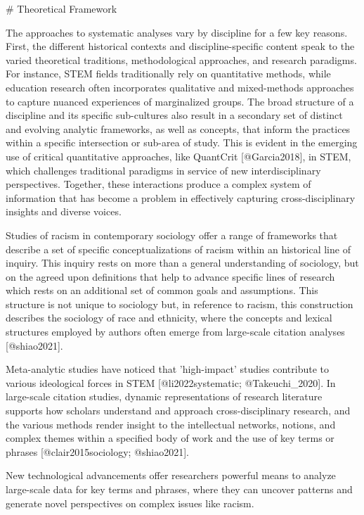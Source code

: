 # Theoretical Framework

The approaches to systematic analyses vary by discipline for a few key reasons. 
First, the different historical contexts and discipline-specific content speak to the varied theoretical traditions, methodological approaches, and research paradigms.
For instance, STEM fields traditionally rely on quantitative methods, while education research often incorporates qualitative and mixed-methods approaches to capture nuanced experiences of marginalized groups.
The broad structure of a discipline and its specific sub-cultures also result in a secondary set of distinct and evolving analytic frameworks, as well as concepts, that inform the practices within a specific intersection or sub-area of study.
This is evident in the emerging use of critical quantitative approaches, like QuantCrit [@Garcia2018], in STEM, which challenges traditional paradigms in service of new interdisciplinary perspectives.
Together, these interactions produce a complex system of information that has become a problem in effectively capturing cross-disciplinary insights and diverse voices.

Studies of racism in contemporary sociology offer a range of frameworks that describe a set of specific conceptualizations of racism within an historical line of inquiry.
This inquiry rests on more than a general understanding of sociology, but on the agreed upon definitions that help to advance specific lines of research which rests on an additional set of common goals and assumptions.
This structure is not unique to sociology but, in reference to racism, this construction describes the sociology of race and ethnicity, where the concepts and lexical structures employed by authors often emerge from large-scale citation analyses [@shiao2021]. 

Meta-analytic studies have noticed that 'high-impact' studies contribute to various ideological forces in STEM [@li2022systematic; @Takeuchi_2020]. In large-scale citation studies, dynamic representations of research literature supports how scholars understand and approach cross-disciplinary research, and the various methods render insight to the intellectual networks, notions, and complex themes within a specified body of work and the use of key terms or phrases [@clair2015sociology; @shiao2021].

New technological advancements offer researchers powerful means to analyze large-scale data for key terms and phrases, where they can uncover  patterns and generate novel perspectives on complex issues like racism. 

